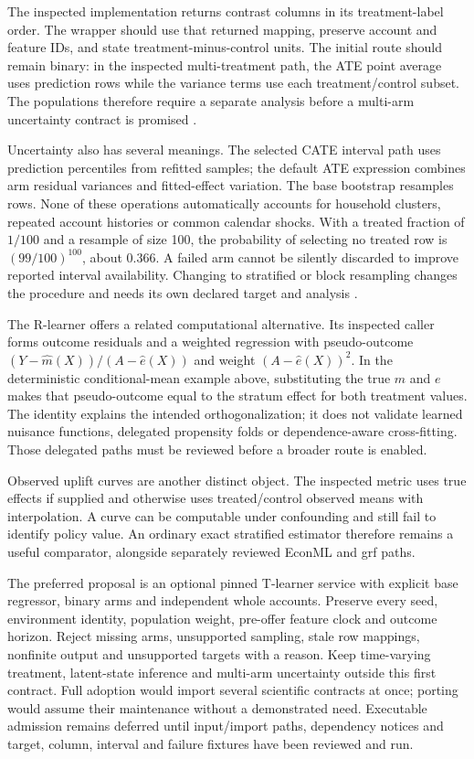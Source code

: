 The inspected implementation returns contrast columns in its treatment-label
order. The wrapper should use that returned mapping, preserve account and
feature IDs, and state treatment-minus-control units. The initial route should
remain binary: in the inspected multi-treatment path, the ATE point average
uses prediction rows while the variance terms use each treatment/control
subset. The populations therefore require a separate analysis before a
multi-arm uncertainty contract is promised \citep{exec14_causalml_primary}.

Uncertainty also has several meanings. The selected CATE interval path uses
prediction percentiles from refitted samples; the default ATE expression
combines arm residual variances and fitted-effect variation. The base bootstrap
resamples rows. None of these operations automatically accounts for household
clusters, repeated account histories or common calendar shocks. With a treated
fraction of $1/100$ and a resample of size 100, the probability of selecting
no treated row is $(99/100)^{100}$, about 0.366. A failed arm cannot be silently
discarded to improve reported interval availability. Changing to stratified
or block resampling changes the procedure and needs its own declared target
and analysis \citep{exec14_causalml_primary,exec14_causalml_oracle}.

The R-learner offers a related computational alternative. Its inspected caller
forms outcome residuals and a weighted regression with pseudo-outcome
$(Y-\widehat m(X))/(A-\widehat e(X))$ and weight
$(A-\widehat e(X))^2$. In the deterministic conditional-mean example above,
substituting the true $m$ and $e$ makes that pseudo-outcome equal to the stratum
effect for both treatment values. The identity explains the intended
orthogonalization; it does not validate learned nuisance functions, delegated
propensity folds or dependence-aware cross-fitting. Those delegated paths
must be reviewed before a broader route is enabled.

Observed uplift curves are another distinct object. The inspected metric
uses true effects if supplied and otherwise uses treated/control observed
means with interpolation. A curve can be computable under confounding and
still fail to identify policy value. An ordinary exact stratified estimator
therefore remains a useful comparator, alongside separately reviewed EconML
and grf paths.

The preferred proposal is an optional pinned T-learner service with explicit
base regressor, binary arms and independent whole accounts. Preserve every
seed, environment identity, population weight, pre-offer feature clock and
outcome horizon. Reject missing arms, unsupported sampling, stale row mappings,
nonfinite output and unsupported targets with a reason. Keep time-varying
treatment, latent-state inference and multi-arm uncertainty outside this first
contract. Full adoption would import several scientific contracts at once;
porting would assume their maintenance without a demonstrated need. Executable
admission remains deferred until input/import paths, dependency notices and
target, column, interval and failure fixtures have been reviewed and run.
\label{exec14:causalml-end}
